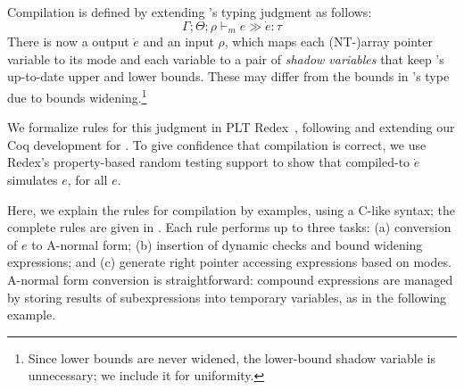 Compilation is defined by extending \lang's
typing judgment as follows:
\[\Gamma;\Theta;\rho \vdash_m e \gg \dot e:\tau\]
There is now a \elang output $\dot e$ and an input $\rho$, which maps
each (NT-)array pointer variable to its mode and
each variable  to a pair of \emph{shadow
  variables} that keep 's up-to-date upper and lower bounds. 
These may differ from the bounds in 's type due to bounds
widening.\footnote{Since lower bounds are never widened, the
  lower-bound shadow variable is unnecessary; we include it for uniformity.} 


We formalize rules for this judgment in PLT Redex~\cite{pltredex},
following and extending our Coq development for \lang. To give
confidence that compilation is correct, we use Redex's property-based
random testing support to show that compiled-to $\dot e $ simulates
$e$, for all $e$.


%
Here, we explain the rules for compilation by
examples, using a C-like syntax; the complete rules are given in
\cite{checkedc-tech-report}.
Each rule performs up to three tasks: (a) conversion of $e$ to
A-normal form; (b) insertion of dynamic checks and bound widening expressions; 
and (c) generate right pointer accessing expressions based on modes.
%
A-normal form conversion is straightforward: compound expressions are managed by storing results of subexpressions into temporary variables,
as in the following example.


